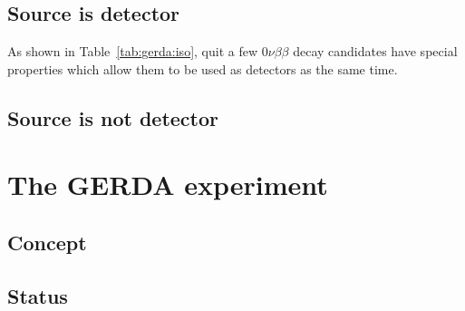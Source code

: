 \subsection{Source is detector}
\label{sec:gerda:sed}
As shown in Table~\ref{tab:gerda:iso}, quit a few $0\nu\beta\beta$ decay candidates have special properties which allow them to be used as detectors as the same time.


\subsection{Source is not  detector}
\label{sec:gerda:sued}

\section{The GERDA experiment}
\label{sec:gerda:concept}

\subsection{Concept}
\label{sec:gerda:concept}

\subsection{Status}
\label{sec:gerda:status}


